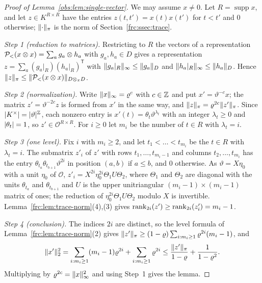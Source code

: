 \begin{proof}[Proof of Lemma~\ref{obs:lem:single-vector}]
We may assume $x\ne0$. Let $R=\operatorname{supp}x$, and let $z\in K^{R\times R}$ have the entries $z(t,t')=x(t)x(t')$
for $t<t'$ and $0$ otherwise; $\lVert \cdot\rVert_\pi$ is the norm of Section~\ref{frc:ssec:trace}.

\emph{Step 1 (reduction to matrices).} Restricting to $R$ the vectors of a representation
$\mathcal P_<(x\otimes x)=\sum_ag_a\otimes h_a$ with $g_a,h_a\in D$ gives a representation
$z=\sum_a(g_a|_R)(h_a|_R)^{\mathsf T}$ with $\lVert g_a|_R\rVert_\infty\le\lVert g_a\rVert_D$ and $\lVert h_a|_R\rVert_\infty\le\lVert h_a\rVert_D$.
Hence $\lVert z\rVert_\pi\le\lVert \mathcal P_<(x\otimes x)\rVert_{D\otimes_\pi D}$.

\emph{Step 2 (normalization).} Write $\lVert x\rVert_\infty=\varrho^c$ with $c\in\mathbb Z$ and put $x'=\vartheta^{-c}x$; the matrix
$z'=\vartheta^{-2c}z$ is formed from $x'$ in the same way, and $\lVert z\rVert_\pi=\varrho^{2c}\lVert z'\rVert_\pi$. Since
$\lvert K^\times\rvert=\lvert \vartheta\rvert^\mathbb Z$, each nonzero entry is $x'(t)=\theta_t\vartheta^{\lambda_t}$ with an integer $\lambda_t\ge0$
and $\lvert \theta_t\rvert=1$, so
$z'\in\mathcal O^{R\times R}$. For $i\ge0$ let $m_i$ be the number of $t\in R$ with $\lambda_t=i$.

\emph{Step 3 (one level).} Fix $i$ with $m_i\ge2$, and let $t_1<\dots<t_{m_i}$ be the $t\in R$ with $\lambda_t=i$. The
submatrix $z'_i$ of $z'$ with rows $t_1,\dots,t_{m_i-1}$ and columns $t_2,\dots,t_{m_i}$ has the entry
$\theta_{t_a}\theta_{t_{b+1}}\vartheta^{2i}$ in position $(a,b)$ if $a\le b$, and $0$ otherwise. As $\vartheta=X\eta_0$
with a unit $\eta_0$ of $\mathcal O$, $z'_i=X^{2i}\eta_0^{2i}\Theta_1U\Theta_2$, where $\Theta_1$ and $\Theta_2$ are
diagonal with the units $\theta_{t_a}$ and $\theta_{t_{b+1}}$ and $U$ is the upper unitriangular
$(m_i-1)\times(m_i-1)$ matrix of ones; the reduction of $\eta_0^{2i}\Theta_1U\Theta_2$ modulo $X$ is invertible.
Lemma~\ref{frc:lem:trace-norm}(4),(3) gives $\operatorname{rank}_{2i}(z')\ge\operatorname{rank}_{2i}(z'_i)=m_i-1$.

\emph{Step 4 (conclusion).} The indices $2i$ are distinct, so the level formula of Lemma~\ref{frc:lem:trace-norm}(2) gives
$\lVert z'\rVert_\pi\ge(1-\varrho)\sum_{i:m_i\ge1}\varrho^{2i}(m_i-1)$, and
\[
 \lVert x'\rVert_2^2=\sum_{i:m_i\ge1}(m_i-1)\varrho^{2i}+\sum_{i:m_i\ge1}\varrho^{2i}
 \le\frac{\lVert z'\rVert_\pi}{1-\varrho}+\frac1{1-\varrho^2}.
\]
Multiplying by $\varrho^{2c}=\lVert x\rVert_\infty^2$ and using Step~1 gives the lemma.
\end{proof}

